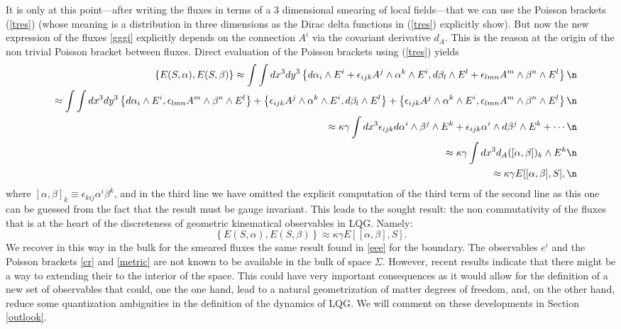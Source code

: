 \documentclass[aps, nofootinbib,superscriptaddress,12pt]{revtex4-2}
\def\be{\begin{equation}}
\def\ee{\end{equation}}
\def\ba{\begin{eqnarray}}
\def\ea{\end{eqnarray}}
\begin{document}
It is only at this point---after writing the fluxes in terms of a $3$ dimensional smearing of local fields---that we can use the Poisson brackets (\ref{tres}) (whose meaning is a distribution in three dimensions as the Dirac delta functions in (\ref{tres}) explicitly show). 
But now the new expression of the fluxes  \eqref{gggi} explicitly depends on the connection $A^i$ via the covariant derivative $d_A$. This is the reason at the origin of the non trivial Poisson bracket between fluxes. Direct evaluation of the Poisson brackets  using (\ref{tres}) yields
\ba
&& \left\{E(S,\alpha),E(S,\beta)\right\}\approx \int\int dx^3 dy^3 \left\{d\alpha_i\wedge E^i+\epsilon_{ijk} A^j\wedge \alpha^k\wedge E^i, 
d\beta_l\wedge E^l+\epsilon_{lmn} A^m\wedge \beta^n\wedge E^l\right\}\n \\
&&\approx \int\int  dx^3 dy^3 \left\{d\alpha_i\wedge E^i, 
\epsilon_{lmn} A^m\wedge \beta^n\wedge E^l\right\}
+\left\{\epsilon_{ijk} A^j\wedge \alpha^k\wedge E^i, 
d\beta_l\wedge E^l\right\}
+\left\{\epsilon_{ijk} A^j\wedge \alpha^k\wedge E^i, 
\epsilon_{lmn} A^m\wedge \beta^n\wedge E^l\right\}\n \\
&&\approx\kappa \gamma \int  dx^3   
\epsilon_{ijk} d\alpha^i\wedge \beta^j\wedge E^k
+\epsilon_{ijk} \alpha^i \wedge d\beta^j \wedge E^k+\cdots \n \\
&&\approx\kappa \gamma \int  dx^3  d_A([\alpha,\beta])_k\wedge E^k\n\\
&&\approx \kappa \gamma E[[\alpha,\beta], S],  \n
\ea
where $[\alpha,\beta]_k\equiv \epsilon_{kij} \alpha^i\beta^k$, and in the third line we have omitted the explicit computation of the third term of the second line as this one can be guessed from the fact that the result must be gauge invariant. This leads to the sought result: the non commutativity of the fluxes that is at the heart of the discreteness of geometric kinematical observables in LQG. Namely:
\be\label{npc1}
\left\{E(S,\alpha),E(S,\beta)\right\}\approx\kappa \gamma E[[\alpha,\beta], S].
\ee
We recover in this way in the bulk for the smeared fluxes
the same result found in \eqref{eee} for the boundary. The observables $e^i$ and the Poisson brackets \eqref{cr} and \eqref{metric}
are not known to be available in the bulk of space $\Sigma$. However, recent results \cite{Freidel:2016bxd} indicate that there might be a way to extending their to the interior of the space. This could have very important consequences as it would allow for the definition of a new set of observables that could, one the one hand, lead to a natural geometrization of matter degrees of freedom, and, on the other hand, reduce some quantization ambiguities in the definition of the dynamics of LQG. We will comment on these developments in Section \ref{outlook}. 
\end{document}
